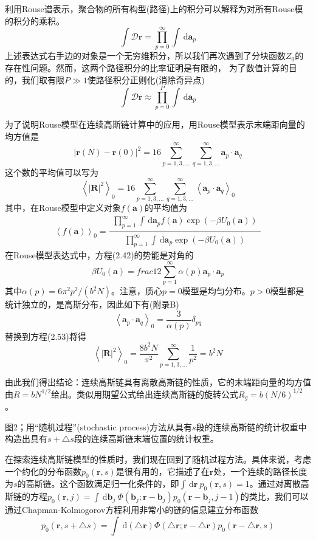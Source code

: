 \documentclass[12pt,a4paper]{article}
\begin{document}
利用Rouse谱表示，聚合物的所有构型(路径)上的积分可以解释为对所有Rouse模的积分的乘积。
$$\int \mathcal{D}\mathbf{r}= \prod_{p=0}^{\infty} \int \, \mathrm{d} \mathbf{a}_p$$
上述表达式右手边的对象是一个无穷维积分，所以我们再次遇到了分块函数$Z_0$的存在性问题。然而，这两个路径积分的比率证明是有限的，
为了数值计算的目的，我们取有限$P\gg1$使路径积分正则化(消除奇异点)
$$\int \mathcal{D}\mathbf{r}\approx \prod_{p=0}^{P} \int \, \mathrm{d} \mathbf{a}_p$$

为了说明Rouse模型在连续高斯链计算中的应用，用Rouse模型表示末端距向量的均方值是
$$\left | \mathbf{r}(N)-\mathbf{r}(0) \right |^2=16\sum_{p=1,3,...}^{\infty}\sum_{q=1,3,...}^{\infty} \mathbf{a}_p \cdot \mathbf{a}_q$$
这个数的平均值可以写为
$$\left \langle \left| \mathbf{R} \right|^2 \right \rangle _0=16\sum_{p=1,3,...}^{\infty}\sum_{q=1,3,...}^{\infty} \left \langle \mathbf{a}_p \cdot \mathbf{a}_q \right \rangle _0$$
其中，在Rouse模型中定义对象$f(\mathbf{a})$的平均值为
$$\left \langle f(\mathbf{a}) \right \rangle _0=\frac{\begin{matrix} \prod_{p=1}^{\infty} \int \, \mathrm{d} \mathbf{a}_p f(\mathbf{a})\exp(-\beta U_0(\mathbf{a})) \end{matrix}}{\begin{matrix} \prod_{p=1}^{\infty} \int \, \mathrm{d} \mathbf{a}_p \exp(-\beta U_0(\mathbf{a})) \end{matrix}}$$
在Rouse模型表达式中，方程(2.42)的势能是对角的
$$\beta U_0(\mathbf{a})=frac{1}{2}\sum_{p=1}^{\infty}\alpha (p)\mathbf{a}_p \cdot \mathbf{a}_p$$
其中$\alpha (p)=6\pi ^2p^2/(b^2N)$。注意，质心$p=0$模型是均匀分布。$p>0$模型都是统计独立的，是高斯分布，因此如下有(附录B)
$$\left \langle \mathbf{a}_p \cdot \mathbf{a}_q \right \rangle _0=\frac{3}{\alpha (p)}\delta _{pq}$$
替换到方程(2.53)将得
$$\left \langle \left| \mathbf{R} \right|^2 \right \rangle _0=\frac{8b^2N}{\pi ^2}\sum_{p=1,3,...}^{\infty}\frac{1}{p^2}=b^2N$$

由此我们得出结论：连续高斯链具有离散高斯链的性质，它的末端距向量的均方值由$R=bN^{1/2}$给出。类似用期望公式给出连续高斯链的旋转公式$R_g=b(N/6)^{1/2}$。


图2；用“随机过程”(stochastic process)方法从具有$s$段的连续高斯链的统计权重中构造出具有$s+\bigtriangleup s$段的连续高斯链末端位置的统计权重。



在探索连续高斯链模型的性质时，我们现在回到了随机过程方法。具体来说，考虑一个约化的分布函数$p_0 (\mathbf{r},s)$是很有用的，它描述了在$\mathbf {r}$处，一个连续的路径长度为$s$的高斯链。这个函数满足归一化条件的，即$\int \, \mathrm{d} \mathbf{r}~p_0(\mathbf{r},s)=1$。通过对离散高斯链的方程$p_0(\mathbf{r},j)=\int \, \mathrm{d} \mathbf{b}_j~\Phi(\mathbf{b}_j;\mathbf{r}-\mathbf{b}_j)p_0(\mathbf{r}-\mathbf{b}_j,j-1)$的类比，我们可以通过Chapman-Kolmogorov方程利用非常小的链的信息建立分布函数
$$p_0(\mathbf{r},s+\bigtriangleup s)=\int \, \mathrm{d}(\bigtriangleup \mathbf{r})\Phi(\bigtriangleup \mathbf{r};\mathbf{r}-\bigtriangleup \mathbf{r})p_0(\mathbf{r}-\bigtriangleup \mathbf{r},s)$$
\end{document}
